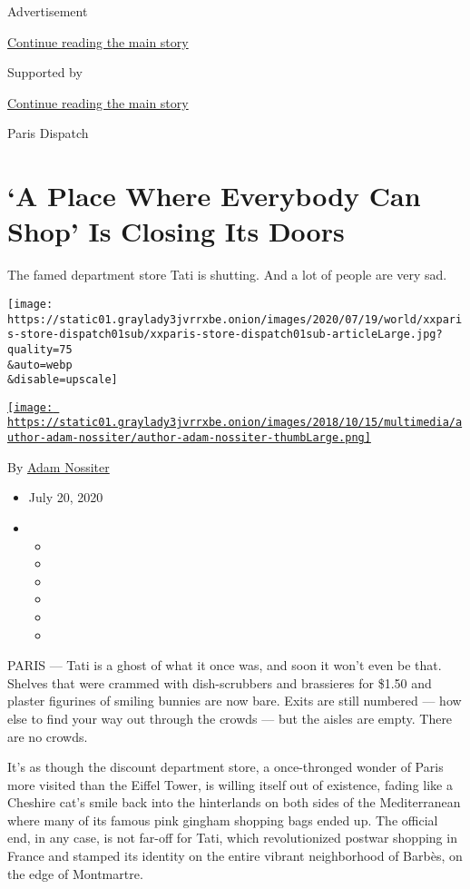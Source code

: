 Advertisement

\protect\hyperlink{after-top}{Continue reading the main story}

Supported by

\protect\hyperlink{after-sponsor}{Continue reading the main story}

Paris Dispatch

\hypertarget{a-place-where-everybody-can-shop-is-closing-its-doors}{%
\section{`A Place Where Everybody Can Shop' Is Closing Its
Doors}\label{a-place-where-everybody-can-shop-is-closing-its-doors}}

The famed department store Tati is shutting. And a lot of people are
very sad.

\texttt{[image: https://static01.graylady3jvrrxbe.onion/images/2020/07/19/world/xxparis-store-dispatch01sub/xxparis-store-dispatch01sub-articleLarge.jpg?quality=75\\\&auto=webp\\\&disable=upscale]}

\href{https://www.nytimes3xbfgragh.onion/by/adam-nossiter}{\texttt{[image: https://static01.graylady3jvrrxbe.onion/images/2018/10/15/multimedia/author-adam-nossiter/author-adam-nossiter-thumbLarge.png]}}

By \href{https://www.nytimes3xbfgragh.onion/by/adam-nossiter}{Adam
Nossiter}

\begin{itemize}
\item
  July 20, 2020
\item
  \begin{itemize}
  \item
  \item
  \item
  \item
  \item
  \item
  \end{itemize}
\end{itemize}

PARIS --- Tati is a ghost of what it once was, and soon it won't even be
that. Shelves that were crammed with dish-scrubbers and brassieres for
\$1.50 and plaster figurines of smiling bunnies are now bare. Exits are
still numbered --- how else to find your way out through the crowds ---
but the aisles are empty. There are no crowds.

It's as though the discount department store, a once-thronged wonder of
Paris more visited than the Eiffel Tower, is willing itself out of
existence, fading like a Cheshire cat's smile back into the hinterlands
on both sides of the Mediterranean where many of its famous pink gingham
shopping bags ended up. The official end, in any case, is not far-off
for Tati, which revolutionized postwar shopping in France and stamped
its identity on the entire vibrant neighborhood of Barbès, on the edge
of Montmartre.

